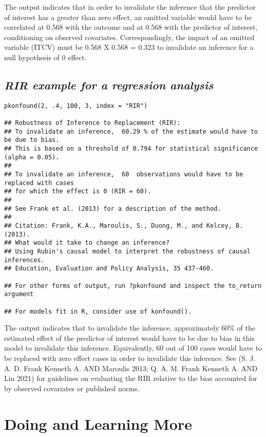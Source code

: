 \documentclass[
]{article}
\begin{document}
The output indicates that in order to invalidate the inference that the
predictor of interest has a greater than zero effect, an omitted
variable would have to be correlated at 0.568 with the outcome and at
0.568 with the predictor of interest, conditioning on observed
covariates. Correspondingly, the impact of an omitted variable (ITCV)
must be 0.568 X 0.568 = 0.323 to invalidate an inference for a null
hypothesis of 0 effect.

\hypertarget{rir-example-for-a-regression-analysis}{%
\subsection{\texorpdfstring{\emph{RIR example for a regression
analysis}}{RIR example for a regression analysis}}\label{rir-example-for-a-regression-analysis}}

\begin{verbatim}
pkonfound(2, .4, 100, 3, index = "RIR")

## Robustness of Inference to Replacement (RIR):
## To invalidate an inference,  60.29 % of the estimate would have to be due to bias. 
## This is based on a threshold of 0.794 for statistical significance (alpha = 0.05).
## 
## To invalidate an inference,  60  observations would have to be replaced with cases
## for which the effect is 0 (RIR = 60).
## 
## See Frank et al. (2013) for a description of the method.
## 
## Citation: Frank, K.A., Maroulis, S., Duong, M., and Kelcey, B. (2013).
## What would it take to change an inference?
## Using Rubin's causal model to interpret the robustness of causal inferences.
## Education, Evaluation and Policy Analysis, 35 437-460.

## For other forms of output, run ?pkonfound and inspect the to_return argument

## For models fit in R, consider use of konfound().
\end{verbatim}

The output indicates that to invalidate the inference, approximately
60\% of the estimated effect of the predictor of interest would have to
be due to bias in this model to invalidate this inference. Equivalently,
60 out of 100 cases would have to be replaced with zero effect cases in
order to invalidate this inference. See (S. J. A. D. Frank Kenneth A.
AND Maroulis 2013; Q. A. M. Frank Kenneth A. AND Lin 2021) for
guidelines on evaluating the RIR relative to the bias accounted for by
observed covariates or published norms.

\hypertarget{doing-and-learning-more}{%
\section{Doing and Learning More}\label{doing-and-learning-more}}
\end{document}
